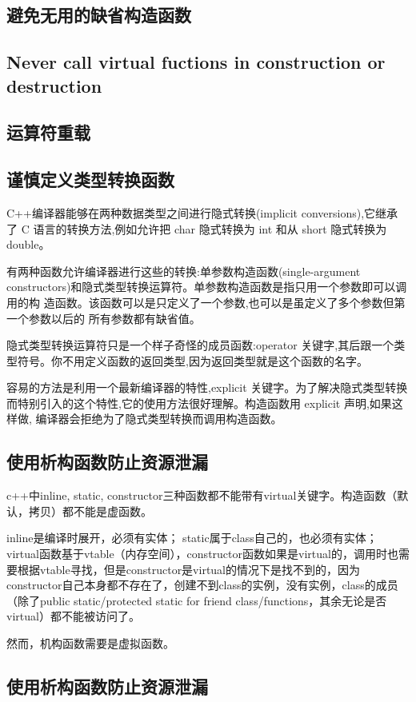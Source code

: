 \subsection{避免无用的缺省构造函数}
\subsection{Never call virtual fuctions in construction or destruction}
\subsection{运算符重载}
\subsection{谨慎定义类型转换函数}
C++编译器能够在两种数据类型之间进行隐式转换(implicit conversions),它继承 了 C 语言的转换方法,例如允许把 char 隐式转换为 int 和从 short 隐式转换为 double。

有两种函数允许编译器进行这些的转换:单参数构造函数(single-argument constructors)和隐式类型转换运算符。单参数构造函数是指只用一个参数即可以调用的构 造函数。该函数可以是只定义了一个参数,也可以是虽定义了多个参数但第一个参数以后的 所有参数都有缺省值。

隐式类型转换运算符只是一个样子奇怪的成员函数:operator 关键字,其后跟一个类
型符号。你不用定义函数的返回类型,因为返回类型就是这个函数的名字。

容易的方法是利用一个最新编译器的特性,explicit 关键字。为了解决隐式类型转换 而特别引入的这个特性,它的使用方法很好理解。构造函数用 explicit 声明,如果这样做, 编译器会拒绝为了隐式类型转换而调用构造函数。

\subsection{使用析构函数防止资源泄漏}
c++中inline, static, constructor三种函数都不能带有virtual关键字。构造函数（默认，拷贝）都不能是虚函数。

inline是编译时展开，必须有实体；
static属于class自己的，也必须有实体；
virtual函数基于vtable（内存空间），constructor函数如果是virtual的，调用时也需要根据vtable寻找，但是constructor是virtual的情况下是找不到的，因为constructor自己本身都不存在了，创建不到class的实例，没有实例，class的成员（除了public static/protected static for friend class/functions，其余无论是否virtual）都不能被访问了。

然而，机构函数需要是虚拟函数。

\subsection{使用析构函数防止资源泄漏}
